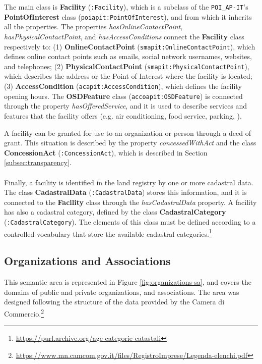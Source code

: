 The main class is \textbf{Facility} (\verb#:Facility#), which is a subclass of the \verb#POI_AP-IT#'s \textbf{PointOfInterest} class (\verb#poiapit:PointOfInterest#), and from which it inherits all the properties. The properties \textit{hasOnlineContactPoint}, \textit{hasPhysicalContactPoint}, and \textit{hasAccessConditions} connect the \textbf{Facility} class respectively to: (1) \textbf{OnlineContactPoint} (\verb#smapit:OnlineContactPoint#), which defines online contact points such as emails, social network usernames, websites, and telephones; (2) \textbf{PhysicalContactPoint} (\verb#smapit:PhysicalContactPoint#), which describes the address or the Point of Interest where the facility is located; (3) \textbf{AccessCondition} (\verb#acapit:AccessCondition#), which defines the facility opening hours. The \textbf{OSDFeature} class (\verb#accoapit:OSDFeature#) is connected through the property \textit{hasOfferedService}, and it is used to describe services and features that the facility offers (e.g. air conditioning, food service, parking, \etc).

A facility can be granted for use to an organization or person through a deed of grant. This situation is described by the property \textit{concessedWithAct} and the class \textbf{ConcessionAct} (\verb#:ConcessionAct#), which is described in Section \ref{subsec:transparency}.

\paragraph*{}
Finally, a facility is identified in the land registry by one or more cadastral data. The class \textbf{CadastralData} (\verb#:CadastralData#) stores this information, and it is connected to the \textbf{Facility} class through the \textit{hasCadastralData} property. A facility has also a cadastral category, defined by the class \textbf{CadastralCategory} (\verb#:CadastralCategory#). The elements of this class must be defined according to a controlled vocabulary that store the available cadastral categories.\footnote{\url{https://purl.archive.org/age-categorie-catastali}}

\subsection{Organizations and Associations}
\label{subsec:organizations-associations}

This semantic area is represented in Figure \ref{fig:organizations-sa}, and covers the domains of public and private organizations, and associations. The area was designed following the structure of the data provided by the Camera di Commercio.\footnote{\url{https://www.mn.camcom.gov.it/files/RegistroImprese/Legenda-elenchi.pdf}}

